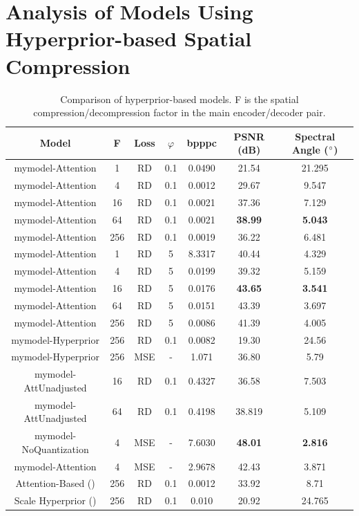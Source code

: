\section[Analysis of Hyperprior-based Models]{Analysis of Models Using Hyperprior-based Spatial Compression\label{sec:ch5hyperprior}}
\begin{table}
\centering
\caption{Comparison of hyperprior-based models. F is the spatial compression/decompression factor in the main encoder/decoder pair.}
\begin{tabular}{|c|c|c|c|c|c|c|}
\hline
Model & F & Loss &$\varphi$ & bpppc & PSNR (dB) & Spectral Angle ($\degree$) \\
\hline\hline
\ac{mymodel}-Attention & 1 & RD & 0.1 & 0.0490 & 21.54 & 21.295 \\
\hline
\ac{mymodel}-Attention & 4 & RD & 0.1 & 0.0012 & 29.67 & 9.547 \\
\hline
\ac{mymodel}-Attention & 16 & RD & 0.1 & 0.0021 & 37.36 & 7.129 \\
\hline
\ac{mymodel}-Attention & 64 & RD & 0.1 & 0.0021 & \textbf{38.99} & \textbf{5.043} \\
\hline
\ac{mymodel}-Attention & 256 & RD & 0.1 & 0.0019 & 36.22 & 6.481 \\
\hline
\ac{mymodel}-Attention & 1 & RD & 5 & 8.3317 & 40.44 & 4.329 \\
\hline
\ac{mymodel}-Attention & 4 & RD & 5 & 0.0199 & 39.32 & 5.159 \\
\hline
\ac{mymodel}-Attention & 16 & RD & 5 & 0.0176 & \textbf{43.65} & \textbf{3.541} \\
\hline
\ac{mymodel}-Attention & 64 & RD & 5 & 0.0151 & 43.39 & 3.697 \\
\hline
\ac{mymodel}-Attention & 256 & RD & 5 & 0.0086 & 41.39 & 4.005 \\
\hline
\ac{mymodel}-Hyperprior & 256 & RD & 0.1 & 0.0082 & 19.30 & 24.56 \\
\hline
\ac{mymodel}-Hyperprior & 256 & MSE & - & 1.071 & 36.80 & 5.79 \\
\hline
\ac{mymodel}-AttUnadjusted & 16 & RD & 0.1 & 0.4327 & 36.58 & 7.503 \\
\hline
\ac{mymodel}-AttUnadjusted & 64 & RD & 0.1 & 0.4198 & 38.819 & 5.109 \\
\hline
\ac{mymodel}-NoQuantization & 4 & MSE & - & 7.6030 & \textbf{48.01} & \textbf{2.816} \\
\hline
\ac{mymodel}-Attention & 4 & MSE & - & 2.9678 & 42.43 & 3.871 \\
\hline
Attention-Based (\citep{cheng_learned_2020}) & 256 & RD & 0.1 & 0.0012 & 33.92 & 8.71 \\
\hline
Scale Hyperprior (\citep{balle_variational_2018}) & 256 & RD & 0.1 & 0.010 & 20.92 & 24.765 \\
\hline
\end{tabular}
\label{fig:hyperpriorcomp}
\end{table}

